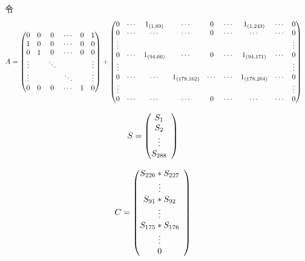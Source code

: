 令
\begin{align}
\label{eq:struct_A}
& A = \left(
\begin{array}{@{}*{6}{c}@{}}
0 & 0 & 0 & \cdots & 0 & 1 \\
1 & 0 & 0 & \cdots & 0 & 0 \\
0 & 1 & 0 & \cdots & 0 & 0 \\
\vdots & & \ddots & & & \vdots \\
\vdots & & & \ddots & & \vdots \\
0 & 0 & 0 & \cdots & 1 & 0 \\
\end{array}
\right)+\left(
\begin{array}{@{}*{9}{c}@{}}
0 & \cdots & 1_{(1,69)} & \cdots & 0 & \cdots & 1_{(1,243)} & \cdots & 0 \\
0 & \cdots & \cdots & \cdots & 0 & \cdots & \cdots & \cdots & 0 \\
\vdots & & & & & & & & \vdots \\
0 & \cdots & 1_{(94,66)} & \cdots & 0 & \cdots & 1_{(94,171)} & \cdots & 0 \\
\vdots & & & & & & & & \vdots \\
0 & \cdots & \cdots & 1_{(178,162)}  & \cdots & \cdots & 1_{(178,264)} & \cdots & 0 \\
\vdots & & & & & & & & \vdots \\
0 & \cdots & \cdots & \cdots & 0 & \cdots & \cdots & \cdots & 0 \\
\end{array}
\right)
\end{align}

\begin{align}
\label{eq:struct_S}
& S = \left(
\begin{array}{@{}*{6}{c}@{}}
S_{1} \\
S_{2} \\
\vdots \\
S_{288} \\
\end{array}
\right)
\end{align}

\begin{align}
\label{eq:struct_C}
& C = \left(
\begin{array}{@{}*{6}{c}@{}}
S_{226} * S_{227} \\
\vdots \\
S_{91} * S_{92} \\
\vdots \\
S_{175} * S_{176} \\
\vdots \\
0 \\
\end{array}
\right)
\end{align}

